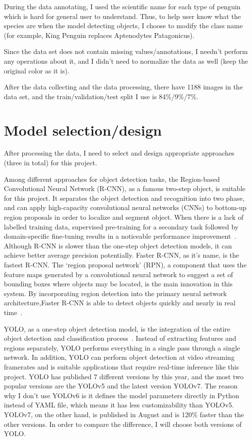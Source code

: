 \documentclass[runningheads]{llncs}
\begin{document}
During the data annotating, I used the scientific name for each type of penguin which is hard for general user to understand. Thus, to help user know what the species are when the model detecting objects, I choose to modify the class name (for example, King Penguin replaces Aptenodytes Patagonicus).

Since the data set does not contain missing values/annotations, I needn't perform any operations about it, and I didn't need to normalize the data as well (keep the original color as it is). 

After the data collecting and the data processing, there have 1188 images in the data set, and the train/validation/test split I use is 84\%/9\%/7\%. 


\section{Model selection/design}
After processing the data, I need to select and design appropriate approaches (three in total) for this project. 

Among different approaches for object detection tasks, the Region-based Convolutional Neural Network (R-CNN), as a famous two-step object, is suitable for this project. It separates the object detection and recognition into two phase, and can apply high-capacity convolutional neural networks (CNNs) to bottom-up region proposals in order to localize and segment object. When there is a lack of labelled training data, supervised pre-training for a secondary task followed by domain-specific fine-tuning results in a noticeable performance improvement~\cite{R-CNN}. Although R-CNN is slower than the one-step object detection models, it can achieve better average precision potentially. Faster R-CNN, as it's name, is the fastest R-CNN. The `region proposal network' (RPN), a component that uses the feature maps generated by a convolutional neural network to suggest a set of bounding boxes where objects may be located, is the main innovation in this system. By incorporating region detection into the primary neural network architecture,Faster R-CNN is able to detect objects quickly and nearly in real time~\cite{Faster R-CNN}.

YOLO, as a one-step object detection model, is the integration of the entire object detection and classification process~\cite{YOLO}. Instead of extracting features and regions separately, YOLO performs everything in a single pass through a single network. In addition, YOLO can perform object detection at video streaming framerates and is suitable applications that require real-time inference like this project. YOLO has published 7 different versions by this year, and the most two popular versions are the YOLOv5 and the latest version YOLOv7. The reason why I don't use YOLOv6 is it defines the model parameters directly in Python instead of YAML file, which means it has less customizability than YOLOv5. YOLOv7, on the other hand, is published in August and is 120\% faster than the other versions. In order to compare the difference, I will choose both versions of YOLO. 
\end{document}
